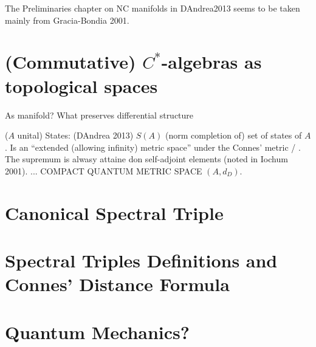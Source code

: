 The Preliminaries chapter on NC manifolds in DAndrea2013 seems to be taken mainly from Gracia-Bondia 2001.

\section{(Commutative) $C^*$-algebras as topological spaces}

As manifold? What preserves differential structure

($A$ unital) States: (DAndrea 2013) $S(A)$ (norm completion of) set of states of $A$. Is an ``extended (allowing infinity) metric space'' under the Connes' metric / . The supremum is alwasy attaine don self-adjoint elements (noted in Iochum 2001). ... COMPACT QUANTUM METRIC SPACE $(A,  d_{D})$.

\section{Canonical Spectral Triple}

\section{Spectral Triples Definitions and Connes' Distance Formula}

\section{Quantum Mechanics?}